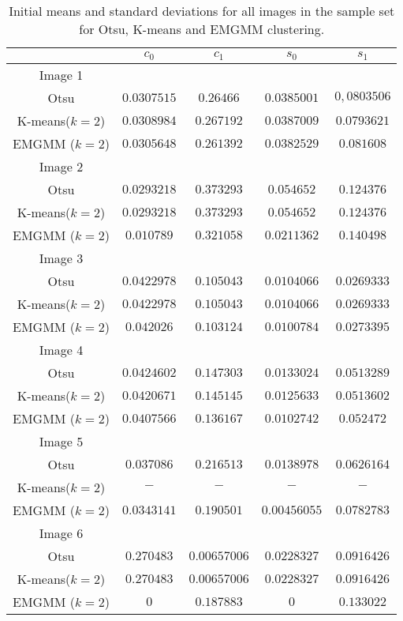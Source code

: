 \begin{table}[t!]
	\centering
	\caption{Initial means and standard deviations for all images in the sample set for Otsu, K-means and EMGMM clustering.}
	\begin{tabular}{|c|c|c|c|c|}
	\hline
	& $c_0$ & $c_1$ & $s_0$ & $s_1$\\
	\hline
	Image 1 & & & & \\
	\hline
	Otsu & $0.0307515$ & $0.26466$ & $0.0385001$ & $0,0803506$ \\
	\hline
	K-means($k=2$) & $0.0308984$ & $0.267192$ & $0.0387009$ & $0.0793621$ \\
	\hline
	EMGMM ($k=2$) & $0.0305648$ & $0.261392$ & $0.0382529$ & $0.081608$ \\
	\hline
	Image 2 & & & & \\
	\hline
	Otsu & $0.0293218$ & $0.373293$ & $0.054652$ & $0.124376$ \\
	\hline
	K-means($k=2$) & $0.0293218$ & $0.373293$ & $0.054652$ & $0.124376$ \\
	\hline
	EMGMM ($k=2$) & $0.010789$ & $0.321058$ & $0.0211362$ & $0.140498$ \\
	\hline
	Image 3 & & & & \\
	\hline
	Otsu & $0.0422978$ & $0.105043$ & $0.0104066$ & $0.0269333$ \\
	\hline
	K-means($k=2$) & $0.0422978$ & $0.105043$ & $0.0104066$ & $0.0269333$ \\
	\hline
	EMGMM ($k=2$) & $0.042026$ & $0.103124$ & $0.0100784$ & $0.0273395$ \\
	\hline
	Image 4 & & & & \\
	\hline
	Otsu & $0.0424602$ & $0.147303$ & $0.0133024$ & $0.0513289$ \\
	\hline
	K-means($k=2$) & $0.0420671$ & $0.145145$ & $0.0125633$ & $0.0513602$ \\
	\hline
	EMGMM ($k=2$) & $0.0407566$ & $0.136167$ & $0.0102742$ & $0.052472$ \\
	\hline
	Image 5 & & & & \\
	\hline
	Otsu & $0.037086$ & $0.216513$ & $0.0138978$ & $0.0626164$ \\
	\hline
	K-means($k=2$) & $-$ & $-$ & $-$ & $-$ \\
	\hline
	EMGMM ($k=2$) & $0.0343141$ & $0.190501$ & $0.00456055$ & $0.0782783$ \\
	\hline
	Image 6 & & & & \\
	\hline
	Otsu & $0.270483$ & $0.00657006$ & $0.0228327$ & $0.0916426$ \\
	\hline
	K-means($k=2$) & $0.270483$ & $0.00657006$ & $0.0228327$ & $0.0916426$ \\
	\hline
	EMGMM ($k=2$) & $0$ & $0.187883$ & $0$ & $0.133022$ \\
	\hline
\end{tabular}
\label{tab:initmaskvalues}
\end{table}

